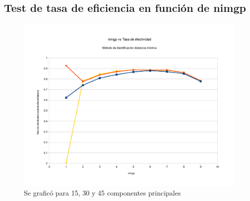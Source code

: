 \subsection{Test de tasa de eficiencia en función de nimgp}
\begin{figure}[H]{}
\centering
\includegraphics[scale=0.5]{graphs/nimgpVsTasaDeEfectividad.pdf}
\caption{Se graficó para 15, 30 y 45 componentes principales}
\label{nimgpvsTE}
\end{figure}
